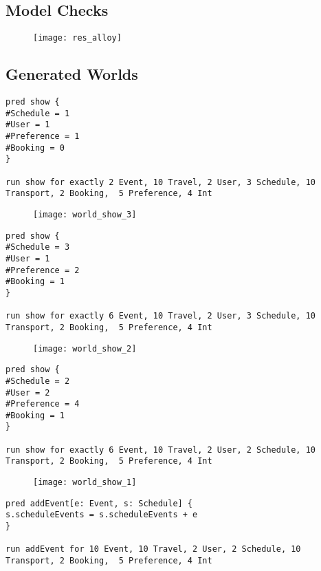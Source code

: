 \subsection{Model Checks}

\begin{figure}[H]
	\centering
	\texttt{[image: res\_alloy]}
\end{figure}

\newpage

\subsection{Generated Worlds}

\begin{lstlisting}[language=alloy]
pred show {
#Schedule = 1
#User = 1
#Preference = 1
#Booking = 0
}

run show for exactly 2 Event, 10 Travel, 2 User, 3 Schedule, 10 Transport, 2 Booking,  5 Preference, 4 Int
\end{lstlisting}

\begin{figure}[H]
	\centering
	\texttt{[image: world\_show\_3]}
\end{figure}
\newpage
\begin{lstlisting}[language=alloy]
pred show {
#Schedule = 3
#User = 1
#Preference = 2
#Booking = 1
}

run show for exactly 6 Event, 10 Travel, 2 User, 3 Schedule, 10 Transport, 2 Booking,  5 Preference, 4 Int
\end{lstlisting}

\begin{figure}[H]
	\centering
	\texttt{[image: world\_show\_2]}
\end{figure}

\begin{lstlisting}[language=alloy]
pred show {
#Schedule = 2
#User = 2
#Preference = 4
#Booking = 1
}

run show for exactly 6 Event, 10 Travel, 2 User, 2 Schedule, 10 Transport, 2 Booking,  5 Preference, 4 Int
\end{lstlisting}

\begin{figure}[H]
	\centering
	\texttt{[image: world\_show\_1]}
\end{figure}


\begin{lstlisting}[language=alloy]
pred addEvent[e: Event, s: Schedule] {
s.scheduleEvents = s.scheduleEvents + e
}

run addEvent for 10 Event, 10 Travel, 2 User, 2 Schedule, 10 Transport, 2 Booking,  5 Preference, 4 Int
\end{lstlisting}

